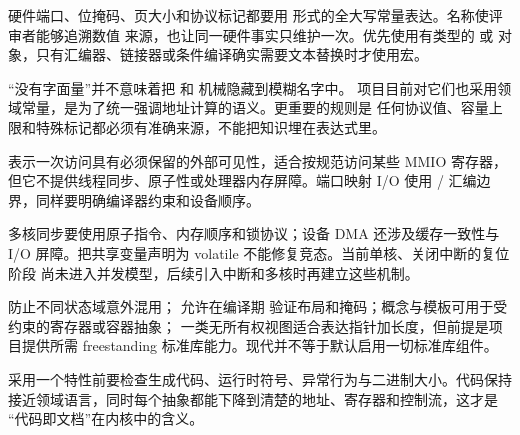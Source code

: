 



硬件端口、位掩码、页大小和协议标记都要用
 形式的全大写常量表达。名称使评审者能够追溯数值
来源，也让同一硬件事实只维护一次。优先使用有类型的  或
 对象，只有汇编器、链接器或条件编译确实需要文本替换时才使用宏。

“没有字面量”并不意味着把  和  机械隐藏到模糊名字中。
项目目前对它们也采用领域常量，是为了统一强调地址计算的语义。更重要的规则是
任何协议值、容量上限和特殊标记都必须有准确来源，不能把知识埋在表达式里。

 表示一次访问具有必须保留的外部可见性，适合按规范访问某些
MMIO 寄存器，但它不提供线程同步、原子性或处理器内存屏障。端口映射 I/O 使用
/ 汇编边界，同样要明确编译器约束和设备顺序。

多核同步要使用原子指令、内存顺序和锁协议；设备 DMA 还涉及缓存一致性与 I/O
屏障。把共享变量声明为 volatile 不能修复竞态。当前单核、关闭中断的复位阶段
尚未进入并发模型，后续引入中断和多核时再建立这些机制。

 防止不同状态域意外混用； 允许在编译期
验证布局和掩码；概念与模板可用于受约束的寄存器或容器抽象；
 一类无所有权视图适合表达指针加长度，但前提是项目提供所需
freestanding 标准库能力。现代并不等于默认启用一切标准库组件。

采用一个特性前要检查生成代码、运行时符号、异常行为与二进制大小。代码保持
接近领域语言，同时每个抽象都能下降到清楚的地址、寄存器和控制流，这才是
“代码即文档”在内核中的含义。
